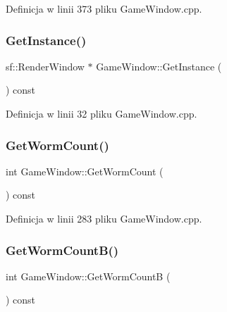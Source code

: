 Definicja w linii 373 pliku Game\+Window.\+cpp.

\mbox{\label{class_game_window_aa5ef8ededf54c333a5b19344b95220de}} 
\subsubsection{\texorpdfstring{Get\+Instance()}{GetInstance()}}
{\footnotesize\ttfamily sf\+::\+Render\+Window $\ast$ Game\+Window\+::\+Get\+Instance (\begin{DoxyParamCaption}{ }\end{DoxyParamCaption}) const}



Definicja w linii 32 pliku Game\+Window.\+cpp.

\mbox{\label{class_game_window_acfef11596afd262e0e4e77051ed24cde}} 
\subsubsection{\texorpdfstring{Get\+Worm\+Count()}{GetWormCount()}}
{\footnotesize\ttfamily int Game\+Window\+::\+Get\+Worm\+Count (\begin{DoxyParamCaption}{ }\end{DoxyParamCaption}) const}



Definicja w linii 283 pliku Game\+Window.\+cpp.

\mbox{\label{class_game_window_a6c6d7e7da6cfc12d33c6da6f84596b15}} 
\subsubsection{\texorpdfstring{Get\+Worm\+Count\+B()}{GetWormCountB()}}
{\footnotesize\ttfamily int Game\+Window\+::\+Get\+Worm\+CountB (\begin{DoxyParamCaption}{ }\end{DoxyParamCaption}) const}



